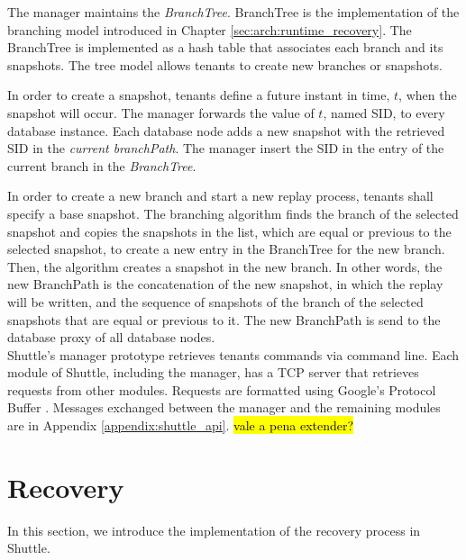 The manager maintains the \textit{BranchTree}. BranchTree is the implementation of the branching model introduced in Chapter \ref{sec:arch:runtime_recovery}. The BranchTree is implemented as a hash table that associates each branch and its snapshots. The tree model allows tenants to create new branches or snapshots.

In order to create a snapshot, tenants define a future instant in time, $t$, when the snapshot will occur. The manager forwards the value of $t$, named \acf{SID}, to every database instance. Each database node adds a new snapshot with the retrieved \ac{SID} in the \emph{current branchPath}. The manager insert the \ac{SID} in the entry of the current branch in the \emph{BranchTree}.

In order to create a new branch and start a new replay process, tenants shall specify a base snapshot. The branching algorithm finds the branch of the selected snapshot and copies the snapshots in the list, which are equal or previous to the selected snapshot, to create a new entry in the BranchTree for the new branch. Then, the algorithm creates a snapshot in the new branch. In other words, the new BranchPath is the concatenation of the new snapshot, in which the replay will be written, and the sequence of snapshots of the branch of the selected snapshots that are equal or previous to it. The new BranchPath is send to the database proxy of all database nodes.\\


Shuttle's manager prototype retrieves tenants commands via command line. Each module of Shuttle, including the manager, has a TCP server that retrieves requests from other modules. Requests are formatted using Google's Protocol Buffer \cite{protobuffers}. Messages exchanged between the manager and the remaining modules are in Appendix \ref{appendix:shuttle_api}. \hl{vale a pena extender?}



\section{Recovery}\label{sec:impl:recovery}
In this section, we introduce the implementation of the recovery process in Shuttle.\\

